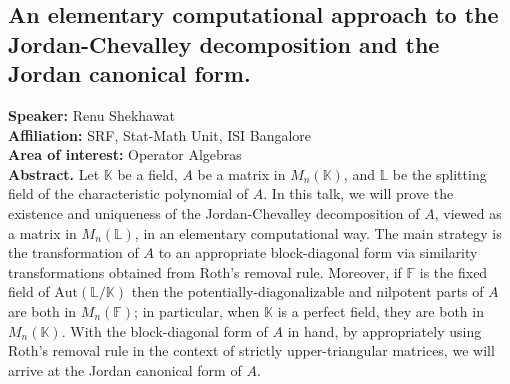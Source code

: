 \subsection*{An elementary computational approach to the Jordan-Chevalley decomposition and the Jordan canonical form.} %
\noindent
\textbf{Speaker:} Renu Shekhawat \\ %
\textbf{Affiliation:} SRF, Stat-Math Unit, ISI Bangalore\\ %
\textbf{Area of interest:} Operator Algebras \\

\noindent\textbf{Abstract.} Let $\mathbb K$ be a field, $A$ be a matrix in $M_n(\mathbb K)$, and $\mathbb L$ be the splitting field of the characteristic polynomial of $A$. In this talk, we will prove the existence and uniqueness of the Jordan-Chevalley decomposition of $A$, viewed as a matrix in $M_n(\mathbb L)$, in an elementary computational way. The main strategy is the transformation of $A$ to an appropriate block-diagonal form via similarity transformations obtained from Roth's removal rule. Moreover, if $\mathbb F$ is the fixed field of $\mathrm{Aut}(\mathbb L/ \mathbb K)$ then the potentially-diagonalizable and nilpotent parts of $A$ are both in $M_n(\mathbb F)$; in particular, when $\mathbb K$ is a perfect field, they are both in $M_n(\mathbb K)$. With the block-diagonal form of $A$ in hand, by appropriately using Roth's removal rule in the context of strictly upper-triangular matrices, we will arrive at the Jordan canonical form of $A$.
